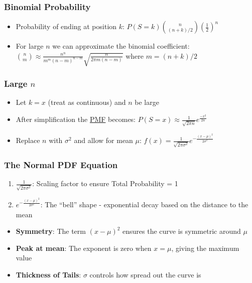 \documentclass[
  a4paper,
]{scrbook}
\providecommand{\tightlist}{%
  \setlength{\itemsep}{0pt}\setlength{\parskip}{0pt}}\usepackage{longtable,booktabs,array}
\begin{document}
\subsubsection{Binomial Probability}\label{binomial-probability}

\begin{itemize}
\item
  Probability of ending at position \(k\):
  \(P(S=k)\binom{n}{(n + k)/2}(\frac{1}{2})^n\)
\item
  For large \(n\) we can approximate the binomial coefficient:
  \(\binom{n}{m} \approx \frac{n^n}{m^m(n-m)^{n-m}}\sqrt{\frac{n}{2\pi m (n-m)}}\)
  where \(m = (n+k)/2\)
\end{itemize}

\subsubsection{\texorpdfstring{Large \(n\)}{Large n}}\label{large-n}

\begin{itemize}
\tightlist
\item
  Let \(k = x\) (treat as continuous) and \(n\) be large
\item
  After simplification the \hyperref[acronyms_PMF]{PMF} becomes:
  \(P(S=x) \approx \frac{1}{\sqrt{2\pi n}}e^{\frac{-x^2}{2n}}\)
\item
  Replace \(n\) with \(\sigma^2\) and allow for mean \(\mu\):
  \(f(x) = \frac{1}{\sqrt{2\pi\sigma^2}}e^{-\frac{(x-\mu)^2}{2\sigma^2}}\)
\end{itemize}

\subsubsection{The Normal PDF Equation}\label{the-normal-pdf-equation}

\begin{enumerate}
\def\labelenumi{\arabic{enumi}.}
\tightlist
\item
  \(\frac{1}{\sqrt{2\pi\sigma^2}}\): Scaling factor to ensure Total
  Probability = 1
\item
  \(e^{-\frac{(x-\mu)^2}{2\sigma^2}}\): The ``bell'' shape - exponential
  decay based on the distance to the mean
\end{enumerate}

\begin{itemize}
\tightlist
\item
  \textbf{Symmetry}: The term \((x-\mu)^2\) ensures the curve is
  symmetric around \(\mu\)
\item
  \textbf{Peak at mean}: The exponent is zero when \(x = \mu\), giving
  the maximum value
\item
  \textbf{Thickness of Tails}: \(\sigma\) controls how spread out the
  curve is
\end{itemize}
\end{document}
